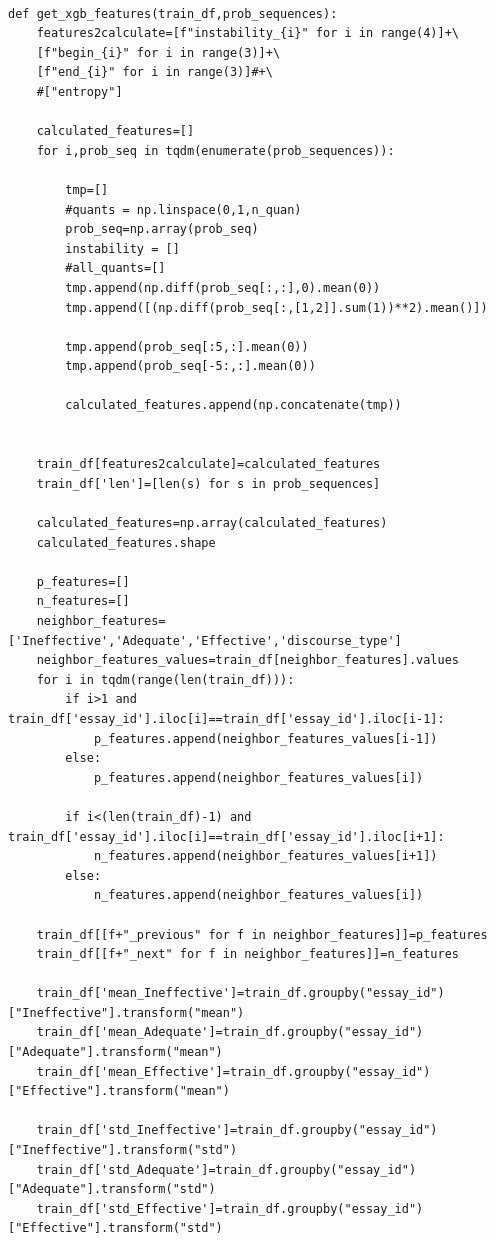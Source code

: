 \documentclass[11pt]{article} %
\begin{document}
\begin{verbatim}

def get_xgb_features(train_df,prob_sequences):
    features2calculate=[f"instability_{i}" for i in range(4)]+\
    [f"begin_{i}" for i in range(3)]+\
    [f"end_{i}" for i in range(3)]#+\
    #["entropy"]

    calculated_features=[]
    for i,prob_seq in tqdm(enumerate(prob_sequences)):

        tmp=[]
        #quants = np.linspace(0,1,n_quan)
        prob_seq=np.array(prob_seq)
        instability = []
        #all_quants=[]
        tmp.append(np.diff(prob_seq[:,:],0).mean(0))
        tmp.append([(np.diff(prob_seq[:,[1,2]].sum(1))**2).mean()])

        tmp.append(prob_seq[:5,:].mean(0))
        tmp.append(prob_seq[-5:,:].mean(0))

        calculated_features.append(np.concatenate(tmp))


    train_df[features2calculate]=calculated_features
    train_df['len']=[len(s) for s in prob_sequences]

    calculated_features=np.array(calculated_features)
    calculated_features.shape

    p_features=[]
    n_features=[]
    neighbor_features=['Ineffective','Adequate','Effective','discourse_type']
    neighbor_features_values=train_df[neighbor_features].values
    for i in tqdm(range(len(train_df))):
        if i>1 and train_df['essay_id'].iloc[i]==train_df['essay_id'].iloc[i-1]:
            p_features.append(neighbor_features_values[i-1])
        else:
            p_features.append(neighbor_features_values[i])

        if i<(len(train_df)-1) and train_df['essay_id'].iloc[i]==train_df['essay_id'].iloc[i+1]:
            n_features.append(neighbor_features_values[i+1])
        else:
            n_features.append(neighbor_features_values[i])

    train_df[[f+"_previous" for f in neighbor_features]]=p_features
    train_df[[f+"_next" for f in neighbor_features]]=n_features

    train_df['mean_Ineffective']=train_df.groupby("essay_id")["Ineffective"].transform("mean")
    train_df['mean_Adequate']=train_df.groupby("essay_id")["Adequate"].transform("mean")
    train_df['mean_Effective']=train_df.groupby("essay_id")["Effective"].transform("mean")

    train_df['std_Ineffective']=train_df.groupby("essay_id")["Ineffective"].transform("std")
    train_df['std_Adequate']=train_df.groupby("essay_id")["Adequate"].transform("std")
    train_df['std_Effective']=train_df.groupby("essay_id")["Effective"].transform("std")


\end{verbatim}
\end{document}
